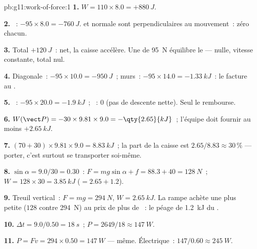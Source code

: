 \begin{solution}{pb:g11:work-of-force:1}
\textbf{1.} $W = 110 \times 8.0 = +\qty{880}{J}$.

\textbf{2.} ~:
$-95 \times 8.0 = -\qty{760}{J}$. 
et  normale sont perpendiculaires au
mouvement~: zéro chacun.

\textbf{3.} Total $+\qty{120}{J}$~:  net, la caisse accélère. Une  de \qty{95}{N} équilibre
le  ---
 nulle, vitesse
constante,  total nul.

\textbf{4.} Diagonale~: $-95 \times 10.0 = -\qty{950}{J}$~; murs~:
$-95 \times 14.0 = -\qty{1.33}{kJ}$~: le
 facture au
.

\textbf{5.} ~:
$-95 \times 20.0 = -\qty{1.9}{kJ}$~;
~: $0$ (pas de descente
nette). Seul le  rembourse.

\textbf{6.} $W(\vect P) = -30 \times 9.81 \times 9.0 =
-\qty{2.65}{kJ}$~; l'équipe doit fournir au moins $+\qty{2.65}{kJ}$.

\textbf{7.} $(70 + 30) \times 9.81 \times 9.0 = \qty{8.83}{kJ}$~; la
part de la caisse est $2.65/8.83 \approx 30\,\%$ --- porter, c'est
surtout se transporter soi-même.

\textbf{8.} $\sin\alpha = 9.0/30 = 0.30$~:
$F = mg\sin\alpha + f = 88.3 + 40 = \qty{128}{N}$~;
$W = 128 \times 30 = \qty{3.85}{kJ}$ ($= 2.65 + 1.2$).

\textbf{9.} Treuil vertical~: $F = mg = \qty{294}{N}$,
$W = \qty{2.65}{kJ}$. La rampe achète une
 plus petite ($128$ contre
\qty{294}{N}) au prix de plus de
~: le péage de
\qty{1.2}{kJ} du .

\textbf{10.} $\Delta t = 9.0/0.50 = \qty{18}{s}$~;
$P = 2649/18 \approx \qty{147}{W}$.

\textbf{11.} $P = Fv = 294 \times 0.50 = \qty{147}{W}$ --- même.
Électrique~: $147/0.60 \approx \qty{245}{W}$.


\end{solution}
